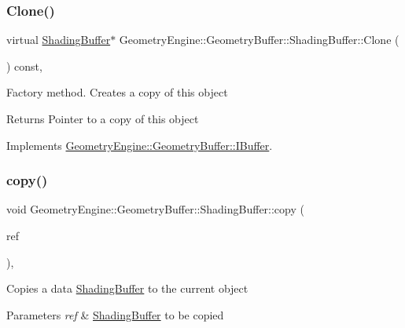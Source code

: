 \subsubsection{\texorpdfstring{Clone()}{Clone()}}
{\footnotesize\ttfamily virtual \mbox{\hyperlink{class_geometry_engine_1_1_geometry_buffer_1_1_shading_buffer}{Shading\+Buffer}}$\ast$ Geometry\+Engine\+::\+Geometry\+Buffer\+::\+Shading\+Buffer\+::\+Clone (\begin{DoxyParamCaption}{ }\end{DoxyParamCaption}) const\hspace{0.3cm}{\ttfamily [inline]}, {\ttfamily [virtual]}}

Factory method. Creates a copy of this object \begin{DoxyReturn}{Returns}
Pointer to a copy of this object 
\end{DoxyReturn}


Implements \mbox{\hyperlink{class_geometry_engine_1_1_geometry_buffer_1_1_i_buffer_a41cb28df27adaea0555afd41169aebd6}{Geometry\+Engine\+::\+Geometry\+Buffer\+::\+I\+Buffer}}.

\mbox{\label{class_geometry_engine_1_1_geometry_buffer_1_1_shading_buffer_ac729c279a19db3d12a5be39aff5e2df1}} 
\subsubsection{\texorpdfstring{copy()}{copy()}}
{\footnotesize\ttfamily void Geometry\+Engine\+::\+Geometry\+Buffer\+::\+Shading\+Buffer\+::copy (\begin{DoxyParamCaption}\item[{const \mbox{\hyperlink{class_geometry_engine_1_1_geometry_buffer_1_1_shading_buffer}{Shading\+Buffer}} \&}]{ref }\end{DoxyParamCaption})\hspace{0.3cm}{\ttfamily [protected]}, {\ttfamily [virtual]}}

Copies a data \mbox{\hyperlink{class_geometry_engine_1_1_geometry_buffer_1_1_shading_buffer}{Shading\+Buffer}} to the current object 
\begin{DoxyParams}{Parameters}
{\em ref} & \mbox{\hyperlink{class_geometry_engine_1_1_geometry_buffer_1_1_shading_buffer}{Shading\+Buffer}} to be copied \\
\hline
\end{DoxyParams}
\mbox{\label{class_geometry_engine_1_1_geometry_buffer_1_1_shading_buffer_a572f4e882695cc97ec4cba7946093d52}} 
